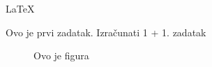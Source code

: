     \LaTeX

    \begin{zad}

        Ovo je prvi zadatak. Izra\v cunati 1 + 1. zadatak

    \end{zad}

    \begin{figure}[h]

        \center


        \caption{Ovo je figura}

    \end{figure}

